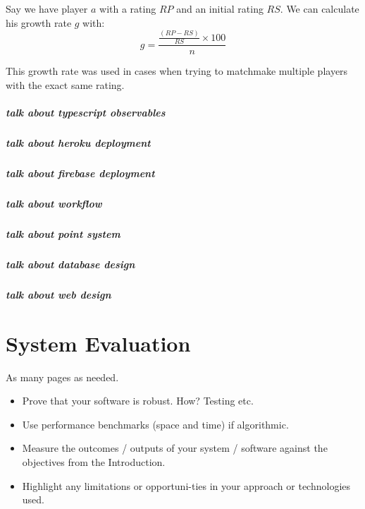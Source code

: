 \begin{center}
\end{center} 

Say we have player $a$ with a rating $RP$ and an initial rating $RS$.
We can calculate his growth rate $g$ with: 
\[ g = \frac{\frac{(RP - RS)}{RS} \times 100}{n} \]

This growth rate was used in cases when trying to matchmake multiple players with the exact same rating.


\paragraph{talk about typescript observables}
\paragraph{talk about heroku deployment}
\paragraph{talk about firebase deployment}
\paragraph{talk about workflow}
\paragraph{talk about point system}
\paragraph{talk about database design}
\paragraph{talk about web design}

\chapter{System Evaluation}
As many pages as needed.
\begin{itemize}
	\item Prove that your software is robust. How? Testing etc. 
	\item Use performance benchmarks (space and time) if algorithmic.
	\item Measure the outcomes / outputs of your system / software against the objectives from the Introduction.
	\item Highlight any limitations or opportuni-ties in your approach or technologies used.
\end{itemize}


